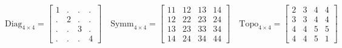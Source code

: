 \begin{equation*}
\mbox{Diag}_{4 \times 4} =
\left[
\begin{array}{rrrr}
  1 & . & . & . \\ 
  . & 2 & . & . \\ 
  . & . & 3 & . \\ 
  . & . & . & 4  
\end{array}
\right]
\quad
%
\mbox{Symm}_{4 \times 4} =
\left[
\begin{array}{rrrr}
  11 & 12 & 13 & 14 \\ 
  12 & 22 & 23 & 24 \\ 
  13 & 23 & 33 & 34 \\ 
  14 & 24 & 34 & 44  
\end{array}
\right]
\quad
%
\mbox{Topo}_{4 \times 4} =
\left[
\begin{array}{rrrr}
  2 & 3 & 4 & 4 \\ 
  3 & 3 & 4 & 4 \\ 
  4 & 4 & 5 & 5 \\ 
  4 & 4 & 5 & 1 
\end{array}
\right]
\end{equation*}

